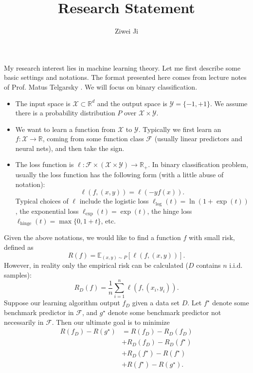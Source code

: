 \documentclass{article}
\author{Ziwei Ji}
\title{Research Statement}
\theoremstyle{definition}
\theoremstyle{remark}
\begin{document}
\maketitle

My research interest lies in machine learning theory. Let me first describe some basic settings and notations. The format presented here comes from lecture notes of Prof. Matus Telgarsky \cite{T17}. We will focus on binary classification.
\begin{itemize}
    \item The input space is $\mathcal{X}\subset \mathbb{R}^d$ and the output space is $\mathcal{Y}=\{-1,+1\}$. We assume there is a probability distribution $P$ over $\mathcal{X}\times \mathcal{Y}$.

    \item We want to learn a function from $\mathcal{X}$ to $\mathcal{Y}$. Typically we first learn an $f:\mathcal{X}\to \mathbb{R}$, coming from some function class $\mathcal{F}$ (usually linear predictors and neural nets), and then take the sign.

    \item The loss function is $\ell:\mathcal{F}\times\left(\mathcal{X}\times \mathcal{Y}\right)\to \mathbb{R}_+$. In binary classification problem, usually the loss function has the following form (with a little abuse of notation):
    \begin{equation*}
        \ell\left(f,(x,y)\right)=\ell\left(-yf(x)\right).
    \end{equation*}
    Typical choices of $\ell$ include the logistic loss $\ell_{\mathrm{log}}(t)=\ln\left(1+\exp(t)\right)$, the exponential loss $\ell_{\mathrm{exp}}(t)=\exp(t)$, the hinge loss $\ell_{\mathrm{hinge}}(t)=\max\{0,1+t\}$, etc.
\end{itemize}

Given the above notations, we would like to find a function $f$ with small risk, defined as
\begin{equation*}
    R(f)=\mathbb{E}_{(x,y)\sim P}\left[\ell\left(f,(x,y)\right)\right].
\end{equation*}
However, in reality only the empirical risk can be calculated ($D$ contains $n$ i.i.d. samples):
\begin{equation*}
    R_D(f)=\frac{1}{n}\sum_{i=1}^{n}\ell\left(f,(x_i,y_i)\right).
\end{equation*}
Suppose our learning algorithm output $f_D$ given a data set $D$. Let $f^{\star}$ denote some benchmark predictor in $\mathcal{F}$, and $g^{\star}$ denote some benchmark predictor not necessarily in $\mathcal{F}$. Then our ultimate goal is to minimize
\begin{align*}
    R(f_D)-R(g^{\star}) & =R(f_D)-R_D(f_D) \\
     & +R_D(f_D)-R_D(f^{\star}) \\
     & +R_D(f^{\star})-R(f^{\star}) \\
     & +R(f^{\star})-R(g^{\star}).
\end{align*}
\end{document}
